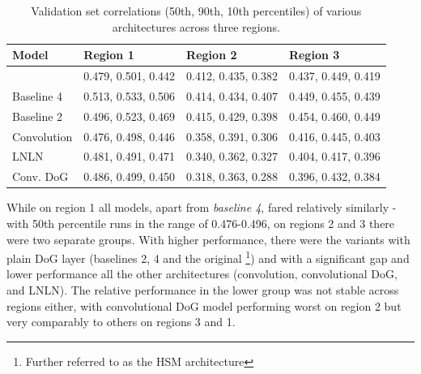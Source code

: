 \setlength{\abovecaptionskip}{10pt plus 0pt minus 0pt} %
\begin{table}[H]
    \renewcommand{\arraystretch}{1.0}
    \centering
    \begin{tabular}{l|l|l|l}
        \toprule
        \textbf{Model} & \textbf{Region 1} & \textbf{Region 2} & \textbf{Region 3} \\ \midrule
        \citeauthor{antolik} & 0.479, 0.501, 0.442 & 0.412, 0.435, 0.382 & 0.437, 0.449, 0.419 \\ 
        Baseline 4 & 0.513, 0.533, 0.506 & 0.414, 0.434, 0.407 & 0.449, 0.455, 0.439 \\ 
        Baseline 2 & 0.496, 0.523, 0.469 & 0.415, 0.429, 0.398 & 0.454, 0.460, 0.449 \\ 
        Convolution & 0.476, 0.498, 0.446 & 0.358, 0.391, 0.306 & 0.416, 0.445, 0.403 \\ 
        LNLN & 0.481, 0.491, 0.471 & 0.340, 0.362, 0.327 & 0.404, 0.417, 0.396 \\ 
        Conv. DoG & 0.486, 0.499, 0.450 & 0.318, 0.363, 0.288 & 0.396, 0.432, 0.384 \\ \bottomrule
    \end{tabular}
    \caption[Performance of various models across regions]{Validation set correlations (50th, 90th, 10th percentiles) of various architectures across three regions.}
    \label{tab:5.3.2.1}
    \renewcommand{\arraystretch}{1.0}
\end{table}
\setlength{\abovecaptionskip}{0pt plus 0pt minus 0pt} %

While on region 1 all models, apart from \textit{baseline 4}, fared relatively similarly - with 50th percentile runs in the range of 0.476-0.496, on regions 2 and 3 there were two separate groups. With higher performance, there were the variants with plain DoG layer (baselines 2, 4 and the original \cite{antolik}\footnote{Further referred to as the HSM architecture}) and with a significant gap and lower performance all the other architectures (convolution, convolutional DoG, and LNLN). The relative performance in the lower group was not stable across regions either, with convolutional DoG model performing worst on region 2 but very comparably to others on regions 3 and 1. 

